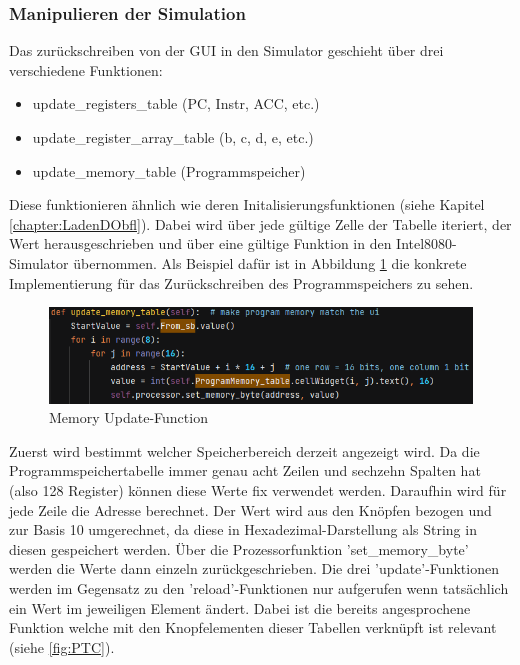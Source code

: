 \documentclass[12pt]{article}
\newcommand{\imgSpaceBefore}{\vspace{10pt}}
\begin{document}

\subsubsection{Manipulieren der Simulation}
Das zurückschreiben von der GUI in den Simulator geschieht über drei verschiedene Funktionen:\imgSpaceBefore

\begin{itemize}
	\item update\_registers\_table (PC, Instr, ACC, etc.)
	\item update\_register\_array\_table (b, c, d, e, etc.)
	\item update\_memory\_table (Programmspeicher)
\end{itemize}

\noindent
Diese funktionieren ähnlich wie deren Initalisierungsfunktionen (siehe Kapitel \ref{chapter:LadenDObfl}). Dabei wird über jede gültige Zelle der Tabelle iteriert, der Wert herausgeschrieben und über eine gültige Funktion in den Intel8080-Simulator übernommen. Als Beispiel dafür ist in Abbildung \ref{fig:MemUpdateFunc} die konkrete Implementierung für das Zurückschreiben des Programmspeichers zu sehen.\imgSpaceBefore

\begin{figure}[H]
\centering
\includegraphics[width=15cm]{bilder/UpdateProgMem}
\caption{Memory Update-Function}
\label{fig:MemUpdateFunc}
\end{figure}

\noindent
Zuerst wird bestimmt welcher Speicherbereich derzeit angezeigt wird. Da die Programmspeichertabelle immer genau acht Zeilen und sechzehn Spalten hat (also 128 Register) können diese Werte fix verwendet werden. Daraufhin wird für jede Zeile die Adresse berechnet. Der Wert wird aus den Knöpfen bezogen und zur Basis 10 umgerechnet, da diese in Hexadezimal-Darstellung als String in diesen gespeichert werden. Über die Prozessorfunktion 'set\_memory\_byte' werden die Werte dann einzeln zurückgeschrieben. Die drei 'update'-Funktionen werden im Gegensatz zu den 'reload'-Funktionen nur aufgerufen wenn tatsächlich ein Wert im jeweiligen Element ändert. Dabei ist die bereits angesprochene Funktion welche mit den Knopfelementen dieser Tabellen verknüpft ist relevant (siehe \ref{fig:PTC}).\imgSpaceBefore
\end{document}
